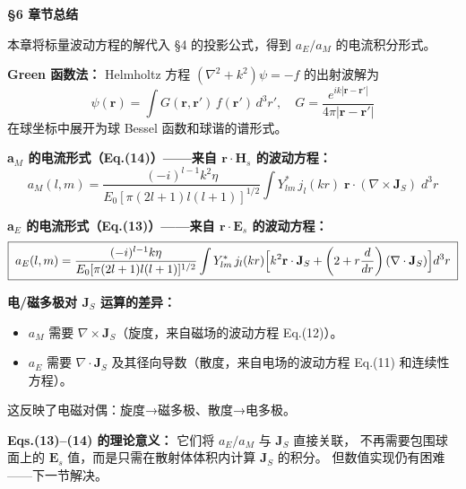 \begin{chaptersummary}

\textbf{§6 章节总结}

本章将标量波动方程的解代入 §4 的投影公式，得到 $a_E/a_M$ 的电流积分形式。

\textbf{Green 函数法：} Helmholtz 方程 $(\nabla^2+k^2)\psi = -f$ 的出射波解为
$$
\psi(\mathbf{r}) = \int G(\mathbf{r},\mathbf{r}')\,f(\mathbf{r}')\,d^3r',\quad
G = \frac{e^{ik|\mathbf{r}-\mathbf{r}'|}}{4\pi|\mathbf{r}-\mathbf{r}'|}
$$
在球坐标中展开为球 Bessel 函数和球谐的谱形式。

\textbf{a$_M$ 的电流形式（Eq.(14)）——来自 $\mathbf{r}\cdot\mathbf{H}_s$ 的波动方程：}
$$
\boxed{\;
a_M(l,m) = \frac{(-i)^{l-1}k^2\eta}{E_0[\pi(2l+1)l(l+1)]^{1/2}}
\int Y_{lm}^*\,j_l(kr)\;\mathbf{r}\cdot(\nabla\times\mathbf{J}_S)\;d^3r
\;}
$$

\textbf{a$_E$ 的电流形式（Eq.(13)）——来自 $\mathbf{r}\cdot\mathbf{E}_s$ 的波动方程：}
$$
\boxed{\;
a_E(l,m) = \frac{(-i)^{l-1}k\eta}{E_0[\pi(2l+1)l(l+1)]^{1/2}}
\int Y_{lm}^*\,j_l(kr)\Bigl[
      k^2\mathbf{r}\cdot\mathbf{J}_S + \left(2 + r\frac{d}{dr}\right)(\nabla\cdot\mathbf{J}_S)
\Bigr] d^3r
\;}
$$

\textbf{电/磁多极对 $\mathbf{J}_S$ 运算的差异：}
\begin{itemize}
  \item $a_M$ 需要 $\nabla\times\mathbf{J}_S$（旋度，来自磁场的波动方程 Eq.(12)）。
  \item $a_E$ 需要 $\nabla\cdot\mathbf{J}_S$ 及其径向导数（散度，来自电场的波动方程 Eq.(11) 和连续性方程）。
\end{itemize}
这反映了电磁对偶：旋度→磁多极、散度→电多极。

\textbf{Eqs.(13)--(14) 的理论意义：} 它们将 $a_E/a_M$ 与 $\mathbf{J}_S$ 直接关联，
不再需要包围球面上的 $\mathbf{E}_s$ 值，而是只需在散射体体积内计算 $\mathbf{J}_S$ 的积分。
但数值实现仍有困难——下一节解决。

\end{chaptersummary}

\newpage

